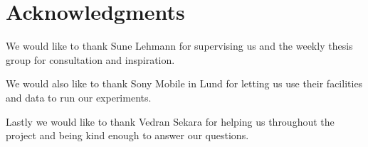 \chapter{Acknowledgments}
We would like to thank Sune Lehmann for supervising us and the weekly thesis group for consultation and inspiration.

We would also like to thank Sony Mobile in Lund for letting us use their facilities and data to run our experiments.

Lastly we would like to thank Vedran Sekara for helping us throughout the project and being kind enough to answer our questions.


